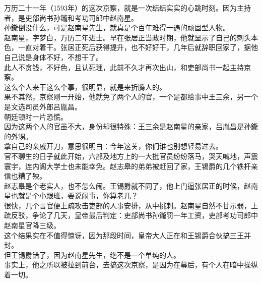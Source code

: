 \begin{multicols}{\theparacolNo}
万历二十一年（1593年）的这次京察，就是一次结结实实的心跳时刻。因为主持者，是吏部尚书孙鑨和考功司郎中赵南星。\\

孙鑨倒没什么，可是赵南星先生，就真是个百年难得一遇的顽固型人物。\\

赵南星，字梦白，万历二年进士。早在张居正当政时期，他就显示了自己的刺头本色，一直对着干。张居正死后获得提升，也不好好干，几年后就辞职回家了，据他自己说是身体不好，不想干了。\\

此人不贪钱，不好色，且认死理，此前不久才再次出山，和吏部尚书一起主持京察。\\

这么个人来干这么个事，很明显，就是来折腾人的。\\

果不其然，京察刚一开始，他就免了两个人的官，一个是都给事中王三余，另一个是文选司员外郎吕胤昌。\\

朝廷顿时一片恐慌。\\

因为这两个人的官虽不大，身份却很特殊：王三余是赵南星的亲家，吕胤昌是孙鑨的外甥。\\

拿自己的亲戚开刀，意思很明白：今年这关，你们谁也别想轻易过去。\\

官不聊生的日子就此开始，六部及地方上的一大批官员纷纷落马，哭天喊地，声震寰宇，连内阁大学士也未能幸免。赵志皋的弟弟被赶回了家，王锡爵的几个铁杆亲信也糟了殃。\\

赵志皋是个老实人，也不怎么闹。王锡爵就不同了，他上门逼张居正的时候，赵南星也就是个小跟班，要说闹事，你算老几？\\

很快，几个言官便上疏攻击吏部的人事安排，从中挑刺。赵南星自然不甘示弱，上疏反驳，争论了几天，皇帝最后判定：吏部尚书孙鑨罚一年工资，吏部考功司郎中赵南星官降三级。\\

这个结果实在不值得惊讶，因为那段时间，皇帝大人正在和王锡爵合伙搞三王并封。\\

但王锡爵错了，因为赵南星先生，绝不是一个单纯的人。\\

事实上，他之所以被拉到前台，去搞这次京察，是因为在幕后，有个人在暗中操纵着一切。\\


\end{multicols}
